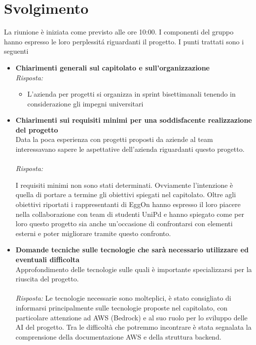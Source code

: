 \documentclass[a4paper,12pt]{article}
\begin{document}
\section{Svolgimento}
    La riunione è iniziata come previsto alle ore 10:00. I componenti del gruppo hanno espresso le loro perplessitá riguardanti il progetto. I punti trattati sono i seguenti
    \begin{itemize}
    \item \textbf{Chiarimenti generali sul capitolato e sull'organizzazione}\\
    \noindent
    \textit{Risposta:} \\
    \begin{itemize}
        \item L'azienda per progetti si organizza in sprint bisettimanali tenendo in considerazione gli impegni universitari
    \end{itemize}
    
    \vspace{1em}

    \item \textbf{Chiarimenti sui requisiti minimi per una soddisfacente realizzazione del progetto}\\
    \noindent
    Data la poca esperienza con progetti proposti da aziende al team interessavano sapere le aspettative dell'azienda riguardanti questo progetto. 
    \\ \\
    \textit{Risposta:} 
    
    I requisiti minimi non sono stati determinati. Ovviamente l'intenzione è quella di portare a termine gli obiettivi spiegati nel capitolato. Oltre agli obiettivi riportati i rappresentanti di EggOn hanno espresso il loro piacere nella collaborazione con team di studenti UniPd e hanno spiegato come per loro questo progetto sia anche un'occasione di confrontarsi con elementi esterni e poter migliorare tramite questo confronto.
    
    \vspace{1em}

    \item \textbf{Domande tecniche sulle tecnologie che sarà necessario utilizzare ed eventuali difficolta}\\
    \noindent
    Approfondimento delle tecnologie sulle quali è importante specializzarsi per la riuscita del progetto.\\ \\
    \textit{Risposta:} 
    Le tecnologie necessarie sono molteplici, è stato consigliato di informarsi principalmente sulle tecnologie proposte nel capitolato, con particolare attenzione ad AWS (Bedrock) e al suo ruolo per lo sviluppo delle AI del progetto. Tra le difficoltà che potremmo incontrare è stata segnalata la comprensione della documentazione AWS e della struttura backend.
    \vspace{1em}


\end{itemize}
\end{document}
